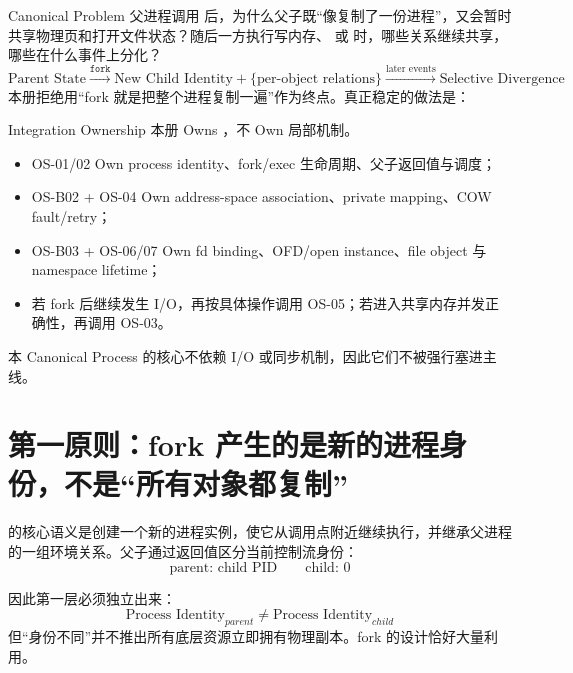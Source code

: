 \documentclass[UTF8,fontset=none,11pt,a4paper]{ctexart}
\begin{document}

\begin{corebox}{Canonical Problem}
父进程调用  后，为什么父子既“像复制了一份进程”，又会暂时共享物理页和打开文件状态？随后一方执行写内存、 或  时，哪些关系继续共享，哪些在什么事件上分化？
\[
\boxed{
\text{Parent State}
\xrightarrow{\texttt{fork}}
\text{New Child Identity}
+
\{\text{per-object relations}\}
\xrightarrow{\text{later events}}
\text{Selective Divergence}
}
\]
本册拒绝用“fork 就是把整个进程复制一遍”作为终点。真正稳定的做法是：
\end{corebox}

\begin{methodbox}{Integration Ownership}
本册 Owns ，不 Own 局部机制。
\begin{itemize}
  \item OS-01/02 Own process identity、fork/exec 生命周期、父子返回值与调度；
  \item OS-B02 + OS-04 Own address-space association、private mapping、COW fault/retry；
  \item OS-B03 + OS-06/07 Own fd binding、OFD/open instance、file object 与 namespace lifetime；
  \item 若 fork 后继续发生 I/O，再按具体操作调用 OS-05；若进入共享内存并发正确性，再调用 OS-03。
\end{itemize}
本 Canonical Process 的核心不依赖 I/O 或同步机制，因此它们不被强行塞进主线。
\end{methodbox}

\section{第一原则：fork 产生的是新的进程身份，不是“所有对象都复制”}

 的核心语义是创建一个新的进程实例，使它从调用点附近继续执行，并继承父进程的一组环境关系。父子通过返回值区分当前控制流身份：
\[
\boxed{
\text{parent: child PID}
\qquad
\text{child: }0
}
\]

因此第一层必须独立出来：
\[
\boxed{\text{Process Identity}_{parent} \neq \text{Process Identity}_{child}}
\]
但“身份不同”并不推出所有底层资源立即拥有物理副本。fork 的设计恰好大量利用。
\end{document}
